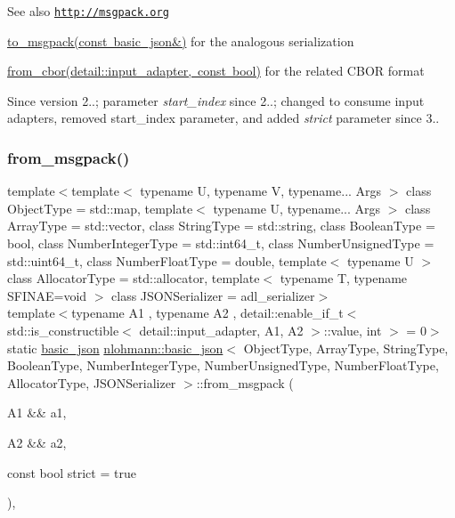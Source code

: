 \begin{DoxySeeAlso}{See also}
\href{http://msgpack.org}{\tt http\+://msgpack.\+org} 

\mbox{\hyperlink{classnlohmann_1_1basic__json_a09ca1dc273d226afe0ca83a9d7438d9c}{to\+\_\+msgpack(const basic\+\_\+json\&)}} for the analogous serialization 

\mbox{\hyperlink{classnlohmann_1_1basic__json_aa9be366b887378bb10c0f1ab510c2f0c}{from\+\_\+cbor(detail\+::input\+\_\+adapter, const bool)}} for the related C\+B\+OR format
\end{DoxySeeAlso}
\begin{DoxySince}{Since}
version 2..; parameter {\itshape start\+\_\+index} since 2..; changed to consume input adapters, removed start\+\_\+index parameter, and added {\itshape strict} parameter since 3.. 
\end{DoxySince}
\mbox{\label{classnlohmann_1_1basic__json_ad435a9e5851197bb8e3d727faf10abc5}} 
\subsubsection{\texorpdfstring{from\+\_\+msgpack()}{from\_msgpack()}\hspace{0.1cm}{\footnotesize\ttfamily [2/2]}}
{\footnotesize\ttfamily template$<$template$<$ typename U, typename V, typename... Args $>$ class Object\+Type = std\+::map, template$<$ typename U, typename... Args $>$ class Array\+Type = std\+::vector, class String\+Type  = std\+::string, class Boolean\+Type  = bool, class Number\+Integer\+Type  = std\+::int64\+\_\+t, class Number\+Unsigned\+Type  = std\+::uint64\+\_\+t, class Number\+Float\+Type  = double, template$<$ typename U $>$ class Allocator\+Type = std\+::allocator, template$<$ typename T, typename S\+F\+I\+N\+A\+E=void $>$ class J\+S\+O\+N\+Serializer = adl\+\_\+serializer$>$ \\
template$<$typename A1 , typename A2 , detail\+::enable\+\_\+if\+\_\+t$<$ std\+::is\+\_\+constructible$<$ detail\+::input\+\_\+adapter, A1, A2 $>$\+::value, int $>$  = 0$>$ \\
static \mbox{\hyperlink{classnlohmann_1_1basic__json}{basic\+\_\+json}} \mbox{\hyperlink{classnlohmann_1_1basic__json}{nlohmann\+::basic\+\_\+json}}$<$ Object\+Type, Array\+Type, String\+Type, Boolean\+Type, Number\+Integer\+Type, Number\+Unsigned\+Type, Number\+Float\+Type, Allocator\+Type, J\+S\+O\+N\+Serializer $>$\+::from\+\_\+msgpack (\begin{DoxyParamCaption}\item[{A1 \&\&}]{a1,  }\item[{A2 \&\&}]{a2,  }\item[{const bool}]{strict = {\ttfamily true} }\end{DoxyParamCaption})\hspace{0.3cm}{\ttfamily [inline]}, {\ttfamily [static]}}



